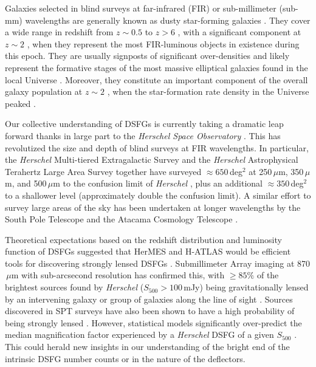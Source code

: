 \documentclass[iop]{emulateapj}
\begin{document}
Galaxies selected in blind surveys at far-infrared (FIR) or sub-millimeter
(sub-mm) wavelengths are generally known as dusty star-forming galaxies
\citep[DSFGs; for a recent review, see][]{Casey:2014lr}.  They cover a wide
range in redshift from $z \sim 0.5$ to $z > 6$ \citep{2005ApJ...622..772C,
Casey:2012qy, Messias:2014fk, Riechers:2013lr}, with a significant component at
$z \sim 2$ \citep{Casey:2012uq, Bothwell:2013lr}, when they represent the most
FIR-luminous objects in existence during this epoch.   They are usually
signposts of significant over-densities \citep{Daddi:2009qy, Capak:2011qy}
\citep[c.f.][]{Robson:2014xy} and likely represent the formative stages of the
most massive elliptical galaxies found in the local Universe
\citep[e.g.,][]{Ivison:2013fk, Fu:2013lr}.  Moreover, they constitute an
important component of the overall galaxy population at $z \sim 2$
\citep[e.g.,][]{Magnelli:2011ul}, when the star-formation rate density in the
Universe peaked \citep[e.g.,][]{Lilly:1996uq, 1996MNRAS.283.1388M}.  

Our collective understanding of DSFGs is currently taking a dramatic leap
forward thanks in large part to the {\it Herschel Space Observatory}
\citep[{\it Herschel};][]{Pilbratt:2010fk}.  This has revolutized the size and
depth of blind surveys at FIR wavelengths.  In particular, the {\it Herschel}
Multi-tiered Extragalactic Survey \citep[HerMES;][]{Oliver:2012lr} and the {\it
Herschel} Astrophysical Terahertz Large Area Survey
\citep[H-ATLAS;][]{2010PASP..122..499E} together have surveyed $\approx
650\,$deg$^2$ at 250$\,\mu$m, 350$\,\mu$m, and 500$\,\mu$m to the confusion
limit of {\it Herschel} \citep[$\sigma \approx 6-7\,$mJy in each
band][]{Nguyen:2010fk}, plus an additional $\approx 350\,$deg$^2$ to a
shallower level (approximately double the confusion limit).  A similar effort
to survey large areas of the sky has been undertaken at longer wavelengths by
the South Pole Telescope \citep[SPT;][]{Carlstrom:2011qy} and the Atacama
Cosmology Telescope \citep{Swetz:2011qy}.

Theoretical expectations based on the redshift distribution and luminosity
function of DSFGs suggested that HerMES and H-ATLAS would be efficient tools
for discovering strongly lensed DSFGs \citep[e.g.,][]{1996MNRAS.283.1340B,
2007MNRAS.377.1557N}.  Submillimeter Array \citep[SMA;][]{Ho:2004lr} imaging at
870$\,\mu$m with sub-arcsecond resolution has confirmed this, with $\geq 85\%$
of the brightest sources found by {\it Herschel} ($S_{500} > 100\,$mJy) being
gravitationally lensed by an intervening galaxy or group of galaxies along the
line of sight \citep{Negrello:2010fk, Conley:2011lr, Riechers:2011uq,
Bussmann:2012lr, Wardlow:2013lr, Bussmann:2013lr}.  Sources discovered in SPT
surveys have also been shown to have a high probability of being strongly
lensed \citep{Vieira:2013fk, Hezaveh:2013fk}.  However, statistical models
significantly over-predict the median magnification factor experienced by a
{\it Herschel} DSFG of a given $S_{500}$ \citep{Bussmann:2013lr}.  This could
herald new insights in our understanding of the bright end of the
intrinsic DSFG number counts or in the nature of the deflectors.
\end{document}
